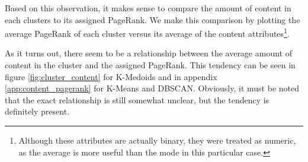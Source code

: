 Based on this observation, it makes sense to compare the amount of content in each clusters to its assigned {PageRank}. We make this comparison by plotting the average {PageRank} of each cluster versus its average of the content attributes\footnote{Although these attributes are actually binary, they were treated as numeric, as the average is more useful than the mode in this particular case.}.

As it turns out, there seem to be a relationship between the average amount of content in the cluster and the assigned {PageRank}. This tendency can be seen in figure \ref{fig:cluster_content} for {K-Medoids} and in appendix \ref{app:content_pagerank} for {K-Means} and {DBSCAN}. Obviously, it must be noted that the exact relationship is still somewhat unclear, but the tendency is definitely present.



